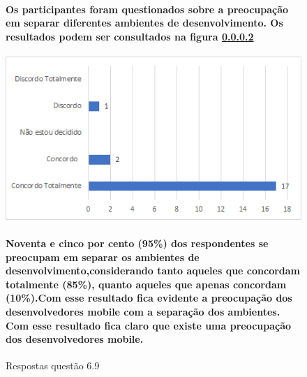 \begin{figure}[!t]
\centering
\paragraph{Os participantes foram questionados sobre a preocupação em separar diferentes ambientes de desenvolvimento. Os resultados podem ser consultados na figura \ref{fig:6.9}}
\includegraphics[scale=0.7]{figuras das questoes/6.9.png}
\caption{Respostas questão 6.9}
\paragraph{Noventa e cinco por cento (95{\%}) dos respondentes se preocupam em separar os ambientes de desenvolvimento,considerando tanto aqueles que concordam totalmente (85{\%}), quanto aqueles que apenas concordam (10{\%}).Com esse resultado fica evidente a preocupação dos desenvolvedores mobile com a separação dos ambientes. Com esse resultado fica claro que existe uma preocupação dos desenvolvedores mobile.}
\label{fig:6.9}
\end{figure}
